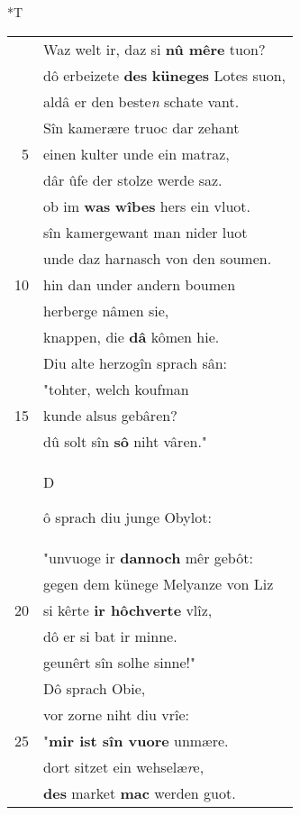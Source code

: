 \documentclass[8pt,a4paper,notitlepage]{article}
\begin{document}
\begin{table}[ht]
\begin{minipage}[t]{0.5\linewidth}
\end{minipage}
\hspace{0.5cm}
\begin{minipage}[t]{0.5\linewidth}
\small
\begin{center}*T
\end{center}
\begin{tabular}{rl}
 & Waz welt ir, daz si \textbf{nû mêre} tuon?\\ 
 & dô erbeizete \textbf{des} \textbf{küneges} Lotes suon,\\ 
 & aldâ er den beste\textit{n} schate vant.\\ 
 & Sîn kamerære truoc dar zehant\\ 
5 & einen kulter unde ein matraz,\\ 
 & dâr ûfe der stolze werde saz.\\ 
 & ob im \textbf{was} \textbf{wîbes} hers ein vluot.\\ 
 & sîn kamergewant man nider luot\\ 
 & unde daz harnasch von den soumen.\\ 
10 & hin dan under andern boumen\\ 
 & herberge nâmen sie,\\ 
 & knappen, die \textbf{dâ} kômen hie.\\ 
 & Diu alte herzogîn sprach sân:\\ 
 & "tohter, welch koufman\\ 
15 & kunde alsus gebâren?\\ 
 & dû solt sîn \textbf{sô} niht vâren."\\ 
 & \begin{large}D\end{large}ô sprach diu junge Obylot:\\ 
 & "unvuoge ir \textbf{dannoch} mêr gebôt:\\ 
 & gegen dem künege Melyanze von Liz\\ 
20 & si kêrte \textbf{ir hôchverte} vlîz,\\ 
 & dô er si bat ir minne.\\ 
 & geunêrt sîn solhe sinne!"\\ 
 & Dô sprach Obie,\\ 
 & vor zorne niht diu vrîe:\\ 
25 & "\textbf{mir ist sîn vuore} unmære.\\ 
 & dort sitzet ein wehselæ\textit{r}e,\\ 
 & \textbf{des} market \textbf{mac} werden guot.\\ 

\end{tabular}
\end{minipage}
\end{table}
\end{document}
